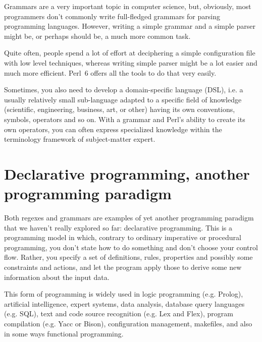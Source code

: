 Grammars are a very important topic in computer science, 
but, obviously, most programmers don't commonly write 
full-fledged grammars for parsing programming languages. 
However, writing a simple grammar and a simple parser 
might be, or perhaps should be, a much more common task. 

Quite often, people spend a lot of effort at deciphering a 
simple configuration file with low level techniques, whereas 
writing simple parser might be a lot easier and much more 
efficient. Perl~6 offers all the tools to do that 
very easily.

Sometimes, you also need to develop a domain-specific 
language (DSL), i.e. a usually relatively small sub-language 
adapted to a specific field of knowledge (scientific, 
engineering, business, art, or other) having its own conventions, 
symbols, operators and so on. With a grammar and Perl's 
ability to create its own operators, you can often express 
specialized knowledge within the terminology framework of 
subject-matter expert.

\section{Declarative programming, another programming paradigm}

Both regexes and grammars are examples of yet another programming 
paradigm that we haven't really explored so far: declarative 
programming. This is a programming model in which, contrary 
to ordinary imperative or procedural programming, you don't 
state how to do something and don't choose your control flow. 
Rather, you specify a set of definitions, rules, properties 
and possibly some constraints and actions, and let the program 
apply those to derive some new information about the input 
data. 


This form of programming is widely used in logic programming 
(e.g. Prolog), artificial intelligence, expert systems, 
data analysis, database query languages (e.g. SQL), text and 
code source recognition (e.g. Lex and Flex), program 
compilation (e.g. Yacc or Bison), configuration management, 
makefiles, and also in some ways functional programming.



